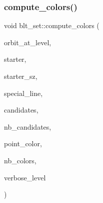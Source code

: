\subsubsection{\texorpdfstring{compute\+\_\+colors()}{compute\_colors()}}
{\footnotesize\ttfamily void blt\+\_\+set\+::compute\+\_\+colors (\begin{DoxyParamCaption}\item[{\mbox{\hyperlink{galois_8h_a09fddde158a3a20bd2dcadb609de11dc}{I\+NT}}}]{orbit\+\_\+at\+\_\+level,  }\item[{\mbox{\hyperlink{galois_8h_a09fddde158a3a20bd2dcadb609de11dc}{I\+NT}} $\ast$}]{starter,  }\item[{\mbox{\hyperlink{galois_8h_a09fddde158a3a20bd2dcadb609de11dc}{I\+NT}}}]{starter\+\_\+sz,  }\item[{\mbox{\hyperlink{galois_8h_a09fddde158a3a20bd2dcadb609de11dc}{I\+NT}}}]{special\+\_\+line,  }\item[{\mbox{\hyperlink{galois_8h_a09fddde158a3a20bd2dcadb609de11dc}{I\+NT}} $\ast$}]{candidates,  }\item[{\mbox{\hyperlink{galois_8h_a09fddde158a3a20bd2dcadb609de11dc}{I\+NT}}}]{nb\+\_\+candidates,  }\item[{\mbox{\hyperlink{galois_8h_a09fddde158a3a20bd2dcadb609de11dc}{I\+NT}} $\ast$\&}]{point\+\_\+color,  }\item[{\mbox{\hyperlink{galois_8h_a09fddde158a3a20bd2dcadb609de11dc}{I\+NT}} \&}]{nb\+\_\+colors,  }\item[{\mbox{\hyperlink{galois_8h_a09fddde158a3a20bd2dcadb609de11dc}{I\+NT}}}]{verbose\+\_\+level }\end{DoxyParamCaption})}

\mbox{\label{classblt__set_ae92249ece99ffbc92e93e49cd5d5dccf}} 
